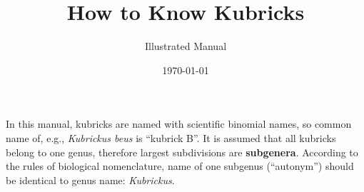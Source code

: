 \documentclass[12pt]{report} %
\title{How to Know Kubricks}
\author{Illustrated Manual}
\date{\today}
\begin{document}
\maketitle

\tableofcontents

\sloppy %

\vspace*{8ex}

In this manual, kubricks are named with scientific binomial names, so
common name of, e.g., \emph{Kubrickus beus} is ``kubrick B''. It is
assumed that all kubricks belong to one genus, therefore largest
subdivisions are \textbf{subgenera}. According to the rules of biological
nomenclature, name of one subgenus (``autonym'') should be identical to
genus name: \emph{Kubrickus}.

\end{document}
